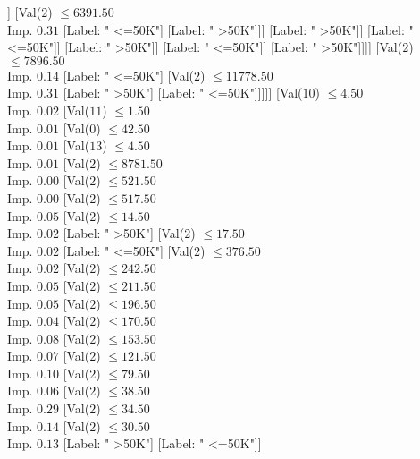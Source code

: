\documentclass[margin=10pt]{standalone}
\begin{document}
\begin{forest}
															[Label: " >50K"]]
														[Val($2$) $ \leq 6391.50$ \\ Imp. $0.31$
															[Label: " <=50K"]
															[Label: " >50K"]]]
													[Label: " >50K"]]
												[Label: " <=50K"]]
											[Label: " >50K"]]
										[Label: " <=50K"]]
									[Label: " >50K"]]]]
						[Val($2$) $ \leq 7896.50$ \\ Imp. $0.14$
							[Label: " <=50K"]
							[Val($2$) $ \leq 11778.50$ \\ Imp. $0.31$
								[Label: " >50K"]
								[Label: " <=50K"]]]]]
				[Val($10$) $ \leq 4.50$ \\ Imp. $0.02$
					[Val($11$) $ \leq 1.50$ \\ Imp. $0.01$
						[Val($0$) $ \leq 42.50$ \\ Imp. $0.01$
							[Val($13$) $ \leq 4.50$ \\ Imp. $0.01$
								[Val($2$) $ \leq 8781.50$ \\ Imp. $0.00$
									[Val($2$) $ \leq 521.50$ \\ Imp. $0.00$
										[Val($2$) $ \leq 517.50$ \\ Imp. $0.05$
											[Val($2$) $ \leq 14.50$ \\ Imp. $0.02$
												[Label: " >50K"]
												[Val($2$) $ \leq 17.50$ \\ Imp. $0.02$
													[Label: " <=50K"]
													[Val($2$) $ \leq 376.50$ \\ Imp. $0.02$
														[Val($2$) $ \leq 242.50$ \\ Imp. $0.05$
															[Val($2$) $ \leq 211.50$ \\ Imp. $0.05$
																[Val($2$) $ \leq 196.50$ \\ Imp. $0.04$
																	[Val($2$) $ \leq 170.50$ \\ Imp. $0.08$
																		[Val($2$) $ \leq 153.50$ \\ Imp. $0.07$
																			[Val($2$) $ \leq 121.50$ \\ Imp. $0.10$
																				[Val($2$) $ \leq 79.50$ \\ Imp. $0.06$
																					[Val($2$) $ \leq 38.50$ \\ Imp. $0.29$
																						[Val($2$) $ \leq 34.50$ \\ Imp. $0.14$
																							[Val($2$) $ \leq 30.50$ \\ Imp. $0.13$
																								[Label: " >50K"]
																								[Label: " <=50K"]]

\end{forest}
\end{document}
